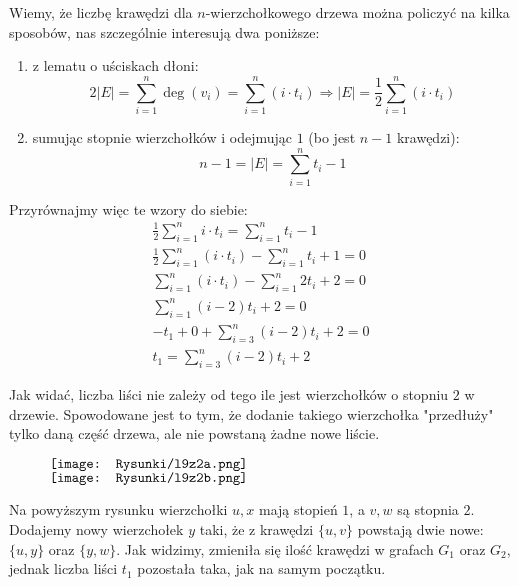 \documentclass[a4paper,12pt]{article}
\newcommand{\abs}[1]{\left| #1 \right|}					%
\begin{document}
\noindent Wiemy, że liczbę krawędzi dla $n$-wierzchołkowego drzewa można policzyć
na kilka sposobów, nas szczególnie interesują dwa poniższe:
\begin{enumerate}
    \item z lematu o uściskach dłoni:
    \[ 
        2 \abs{E} = \sum\limits_{i = 1}^{n} \deg(v_i) = \sum\limits_{i = 1}^{n} (i \cdot t_i)
        \Longrightarrow \abs{E} = \frac{1}{2} \sum\limits_{i = 1}^{n} (i \cdot t_i)
    \]
    \item sumując stopnie wierzchołków i odejmując $1$ (bo jest $n-1$ krawędzi):
    \[
        n - 1 = \abs{E} = \sum\limits_{i = 1}^{n} t_i - 1    
    \]
\end{enumerate}

\noindent Przyrównajmy więc te wzory do siebie:
\begin{gather*} %
    \frac{1}{2} \sum\limits_{i = 1}^{n} i \cdot t_i = \sum\limits_{i = 1}^{n} t_i - 1 \\
    \frac{1}{2} \sum\limits_{i = 1}^{n} (i \cdot t_i) - \sum\limits_{i = 1}^{n} t_i + 1 = 0 \\
    \sum\limits_{i = 1}^{n} (i \cdot t_i) - \sum\limits_{i = 1}^{n} 2t_i + 2 = 0 \\
    \sum\limits_{i = 1}^{n} (i-2) t_i + 2 = 0 \\
    -t_1 + 0 + \sum\limits_{i = 3}^{n} (i-2) t_i + 2 = 0 \\
    t_1 = \sum\limits_{i = 3}^{n} (i-2) t_i + 2
\end{gather*}

\noindent Jak widać, liczba liści nie zależy od tego ile jest wierzchołków
o stopniu $2$ w drzewie. Spowodowane jest to tym, że dodanie takiego wierzchołka
"przedłuży" tylko daną część drzewa, ale nie powstaną żadne nowe liście.

\begin{figure}[H]
	\centering
	$\vcenter{\hbox{\texttt{[image: Rysunki/l9z2a.png]}}}$ \\
    $\vcenter{\hbox{\texttt{[image: Rysunki/l9z2b.png]}}}$
\end{figure}

\noindent Na powyższym rysunku wierzchołki $u, x$ mają stopień $1$, a $v, w$ są
stopnia $2$. Dodajemy nowy wierzchołek $y$ taki, że z krawędzi $\{ u, v \}$
powstają dwie nowe: $\{ u, y \}$ oraz $\{ y, w \}$. Jak widzimy, zmieniła się ilość
krawędzi w grafach $G_1$ oraz $G_2$, jednak liczba liści $t_1$ pozostała taka,
jak na samym początku.
\end{document}
